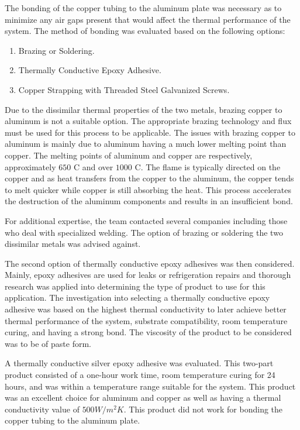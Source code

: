 The bonding of the copper tubing to the aluminum plate was necessary as to minimize any air gaps present that would affect the thermal performance of the system. The method of bonding was evaluated based on the following options:

\medskip
\begin{enumerate}[itemsep=3mm, parsep=-1mm, label=\roman*.]
    \item Brazing or Soldering.
    \item Thermally Conductive Epoxy Adhesive.
    \item Copper Strapping with Threaded Steel Galvanized Screws.
\end{enumerate}

\medskip
Due to the dissimilar thermal properties of the two metals, brazing copper to aluminum is not a suitable option. The appropriate brazing technology and flux must be used for this process to be applicable. The issues with brazing copper to aluminum is mainly due to aluminum having a much lower melting point than copper. The melting points of aluminum and copper are respectively, approximately $650$ \textdegree C and over $1000$ \textdegree C. The flame is typically directed on the copper and as heat transfers from the copper to the aluminum, the copper tends to melt quicker while copper is still absorbing the heat. This process accelerates the destruction of the aluminum components \cite{brazingALCU} and results in an insufficient bond.

\medskip
For additional expertise, the team contacted several companies including those who deal with specialized welding. The option of brazing or soldering the two dissimilar metals was advised against.

\medskip
The second option of thermally conductive epoxy adhesives was then considered. Mainly, epoxy adhesives are used for leaks or refrigeration repairs and thorough research was applied into determining the type of product to use for this application. The investigation into selecting a thermally conductive epoxy adhesive was based on the highest thermal conductivity to later achieve better thermal performance of the system, substrate compatibility, room temperature curing, and having a strong bond. The viscosity of the product to be considered was to be of paste form.

\medskip
A thermally conductive silver epoxy  adhesive was evaluated. This two-part product consisted of a one-hour work time, room temperature curing for 24 hours, and was within a temperature range suitable for the system. This product was an excellent choice for aluminum and copper as well as having a thermal conductivity value of $500 W/m^2K$. This product did not work for bonding the copper tubing to the aluminum plate.

